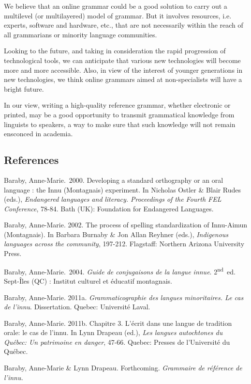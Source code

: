 \documentclass[letterpaper]{article}
\begin{document}
We believe that an online grammar could be a good solution to carry out a multilevel (or multilayered) model of grammar. But it involves resources, i.e. experts, software and hardware, etc., that are not necessarily within the reach of all grammarians or minority language communities.

Looking to the future, and taking in consideration the rapid progression of technological tools,  we can anticipate that various new technologies will become more and more accessible. Also, in view of the interest of younger generations in new technologies, we think online grammars aimed at non-specialists will have a bright future.

In our view, writing a high-quality reference grammar, whether electronic or printed, may be a good opportunity to transmit grammatical knowledge from linguists to speakers, a way to make sure that such knowledge will not remain ensconced in academia.

\subsection{References}
Baraby, Anne-Marie.~2000. Developing a standard orthography or an oral language : the Innu (Montagnais) experiment. In Nicholas Ostler \& Blair Rudes (eds.), \textit{Endangered }\textit{l}\textit{anguages and }\textit{l}\textit{iteracy. Proceedings of the Fourth FEL Conference}, 78-84. Bath (UK): Foundation for Endangered Languages.

Baraby, Anne-Marie. 2002. The process of spelling standardization of Innu-Aimun (Montagnais). In Barbara Burnaby \& Jon Allan Reyhner (eds.), \textit{Indigenous languages across the community}, 197-212. Flagstaff: Northern Arizona University Press.

Baraby, Anne-Marie.~2004. \textit{Guide de conjugaisons de la langue innue}. 2\textsuperscript{nd}~ed. Sept-\^Iles (QC) : Institut culturel et \'educatif montagnais.

Baraby, Anne{}-Marie. 2011a. \textit{Grammaticographie des langues minoritaires. Le cas de l{\textquoteright}innu}. Dissertation. Quebec: Universit\'e Laval.

Baraby, Anne-Marie. 2011b. Chapitre 3. L{\textquoteright}\'ecrit dans une langue de tradition orale: le cas de l{\textquoteright}innu. In Lynn Drapeau (ed.), \textit{Les langues autochtones du Qu\'ebec: Un patrimoine en danger}, 47-66. Quebec: Presses de l{\textquoteright}Universit\'e du Qu\'ebec.

Baraby, Anne-Marie \& Lynn Drapeau. Forthcoming. \textit{Grammaire de r\'ef\'erence de l{\textquoteright}innu.}
\end{document}
